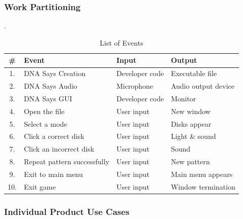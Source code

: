 \documentclass[12pt, titlepage]{article}
\begin{document}
\subsubsection{Work Partitioning}
.
\begin{table}[h!]
	\centering
	\caption{List of Events}
	\label{tab:table2}
	\begin{tabular}{clll}
		\hline
		\# & Event & Input & Output\\
		\hline
		1. & DNA Says Creation & Developer code & Executable file\\
		2. & DNA Says Audio & Microphone & Audio output device\\
		3. & DNA Says GUI & Developer code & Monitor\\
		4. & Open the file & User input & New window\\
		5. & Select a mode & User input & Disks appear\\
		6. & Click a correct disk & User input & Light \& sound\\
		7. & Click an incorrect disk & User input & Sound\\
		8. & Repeat pattern successfully & User input & New pattern\\
		9. & Exit to main menu & User input & Main menu appears\\
		10. & Exit game & User input & Window termination\\
		\hline
	\end{tabular}
\end{table}


\subsubsection{Individual Product Use Cases}
\end{document}
